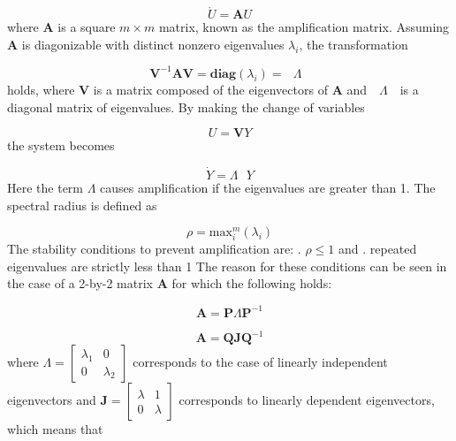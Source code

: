 \documentclass{article}
\begin{document}
				\begin{equation}
					\dot{U} = \textbf{A}U
				\end{equation}
where $\textbf{A}$ is a square $m \times m$ matrix, known as the amplification matrix. Assuming $\textbf{A}$ is diagonizable with distinct nonzero eigenvalues $\lambda_{i}$, the transformation

				\begin{equation}
					\textbf{V}^{-1} \textbf{A} \textbf{V}= \textbf{diag} (\lambda_i) = \textbf{ $\Lambda$ }
				\end{equation}
holds, where $\textbf{V}$ is a matrix composed of the eigenvectors of  $\textbf{A}$ and $\textbf{ $\Lambda$ }$ is a diagonal matrix of eigenvalues. By making the change of variables

				\begin{equation}
					U = \textbf{V}Y
				\end{equation}
 the system becomes

				\begin{equation}
					\dot{Y} = \textbf{$\Lambda$ }Y
				\end{equation}
Here the term $\textbf{$\Lambda$}$ causes amplification if the eigenvalues are greater than 1. The spectral radius is defined as

				\begin{equation*}
					\rho = \text{max}_i^m(\lambda_i)
				\end{equation*}
The stability conditions to prevent amplification are: \newline {}. $\rho \leq 1$ and . repeated eigenvalues are strictly less than 1 \newline \newline
The reason for these conditions can be seen in the case of a 2-by-2 matrix $\textbf{A}$ for which the following holds:

				\begin{equation}
					\textbf{A} = \textbf{P}\textbf{$\Lambda$}\textbf{P}^{-1}
				\end{equation}

				\begin{equation}
					\textbf{A} = \textbf{Q}\textbf{J}\textbf{Q}^{-1}
				\end{equation}
where $\textbf{$\Lambda$} = \begin{bmatrix}\lambda_1&0\\0&\lambda_2\end{bmatrix}$ corresponds to the case of linearly independent eigenvectors and  $\textbf{J} = \begin{bmatrix}\lambda&1\\0&\lambda\end{bmatrix}$ corresponds to linearly dependent eigenvectors, which means that
\end{document}
